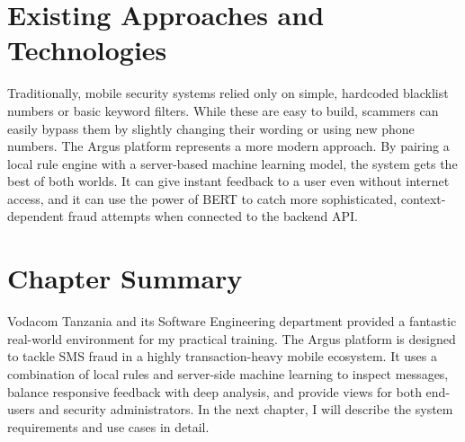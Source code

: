 \section{Existing Approaches and Technologies}
Traditionally, mobile security systems relied only on simple, hardcoded blacklist numbers or basic keyword filters. While these are easy to build, scammers can easily bypass them by slightly changing their wording or using new phone numbers. 
The Argus platform represents a more modern approach. By pairing a local rule engine with a server-based machine learning model, the system gets the best of both worlds. It can give instant feedback to a user even without internet access, and it can use the power of BERT to catch more sophisticated, context-dependent fraud attempts when connected to the backend API.

\section{Chapter Summary}
Vodacom Tanzania and its Software Engineering department provided a fantastic real-world environment for my practical training. The Argus platform is designed to tackle SMS fraud in a highly transaction-heavy mobile ecosystem. It uses a combination of local rules and server-side machine learning to inspect messages, balance responsive feedback with deep analysis, and provide views for both end-users and security administrators. In the next chapter, I will describe the system requirements and use cases in detail.
